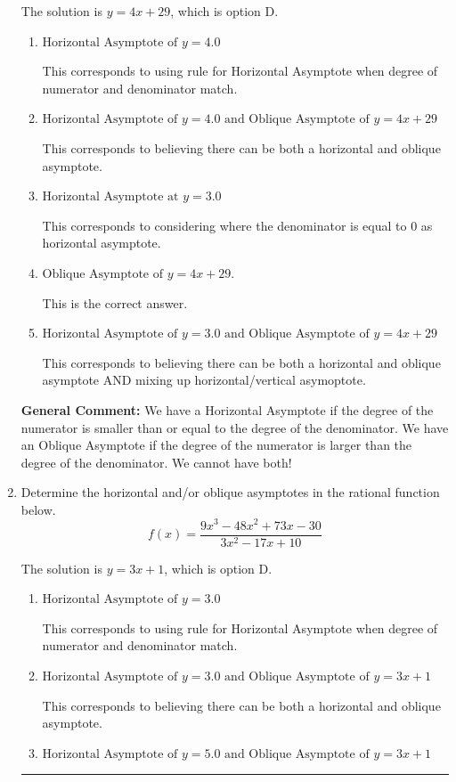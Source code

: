\documentclass{extbook}[14pt]
\newcommand{\litem}[1]{\item #1

\rule{\textwidth}{0.4pt}}
\begin{document}
\begin{enumerate}
{The solution is \( y = 4x + 29 \), which is option D.\begin{enumerate}[label=\Alph*.]
\item \( \text{Horizontal Asymptote of } y = 4.0  \)

This corresponds to using rule for Horizontal Asymptote when degree of numerator and denominator match.
\item \( \text{Horizontal Asymptote of } y = 4.0 \text{ and Oblique Asymptote of } y = 4x + 29 \)

This corresponds to believing there can be both a horizontal and oblique asymptote.
\item \( \text{Horizontal Asymptote at } y = 3.0 \)

This corresponds to considering where the denominator is equal to 0 as horizontal asymptote.
\item \( \text{Oblique Asymptote of } y = 4x + 29. \)

This is the correct answer.
\item \( \text{Horizontal Asymptote of } y = 3.0 \text{ and Oblique Asymptote of } y = 4x + 29 \)

This corresponds to believing there can be both a horizontal and oblique asymptote AND mixing up horizontal/vertical asymoptote.
\end{enumerate}

\textbf{General Comment:} We have a Horizontal Asymptote if the degree of the numerator is smaller than or equal to the degree of the denominator. We have an Oblique Asymptote if the degree of the numerator is larger than the degree of the denominator. We cannot have both!
}
\litem{
Determine the horizontal and/or oblique asymptotes in the rational function below.
\[ f(x) = \frac{9x^{3} -48 x^{2} +73 x -30}{3x^{2} -17 x + 10} \]

The solution is \( y = 3x + 1 \), which is option D.\begin{enumerate}[label=\Alph*.]
\item \( \text{Horizontal Asymptote of } y = 3.0  \)

This corresponds to using rule for Horizontal Asymptote when degree of numerator and denominator match.
\item \( \text{Horizontal Asymptote of } y = 3.0 \text{ and Oblique Asymptote of } y = 3x + 1 \)

This corresponds to believing there can be both a horizontal and oblique asymptote.
\item \( \text{Horizontal Asymptote of } y = 5.0 \text{ and Oblique Asymptote of } y = 3x + 1 \)


\end{enumerate}}
\end{enumerate}
\end{document}
